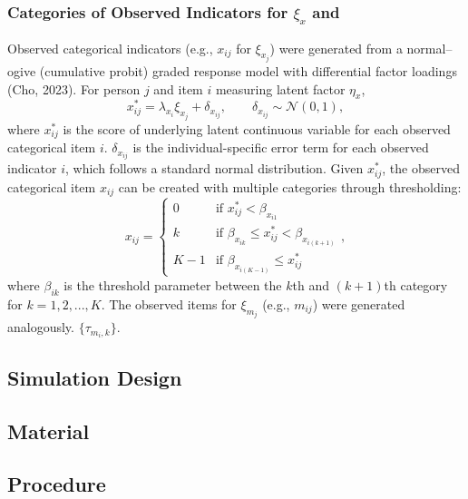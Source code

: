 \documentclass[
  man]{apa6}
\begin{document}
\subsubsection{\texorpdfstring{Categories of Observed Indicators for \(\xi_{x}\) and}{Categories of Observed Indicators for \textbackslash xi\_\{x\} and}}\label{categories-of-observed-indicators-for-xi_x-and}

Observed categorical indicators (e.g., \(x_{ij}\) for \(\xi_{x_{j}}\)) were
generated from a normal--ogive (cumulative probit) graded response model
with differential factor loadings (Cho, 2023). For person \(j\) and item
\(i\) measuring latent factor \(\eta_x\), \begin{equation}
x_{ij}^* = \lambda_{x_{i}}\xi_{x_{j}} + \delta_{x_{ij}},
\qquad \delta_{x_{ij}} \sim \mathcal{N}(0,1),
\end{equation} where \(x_{ij}^*\) is the score of underlying latent
continuous variable for each observed categorical item \(i\).
\(\delta_{x_{ij}}\) is the individual-specific error term for each
observed indicator \(i\), which follows a standard normal distribution.
Given \(x_{ij}^*\), the observed categorical item \(x_{ij}\) can be created
with multiple categories through thresholding: \begin{equation}
  x_{ij} =
    \begin{cases}
      0 & \text{if $x_{ij}^* < \beta_{x_{i1}}$}\\
      k & \text{if $\beta_{x_{ik}} \le x_{ij}^* < \beta_{x_{i(k + 1)}}$}\\
      K - 1 & \text{if $\beta_{x_{i(K - 1)}} \le x_{ij}^*$}
    \end{cases},      
\end{equation} where \(\beta_{ik}\) is the threshold parameter between the
\(k\)th and \((k + 1)\)th category for \(k = 1, 2,...,K\). The observed items
for \(\xi_{m_{j}}\) (e.g., \(m_{ij}\)) were generated analogously.
\(\{\tau_{m_i,k}\}\).

\subsection{Simulation Design}\label{simulation-design}

\subsection{Material}\label{material}

\subsection{Procedure}\label{procedure}
\end{document}
